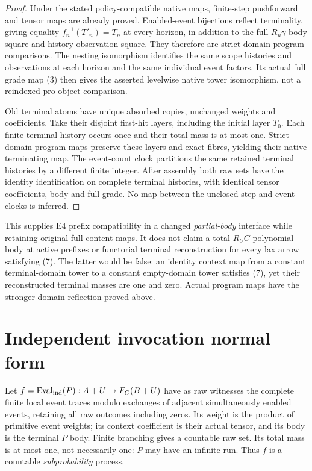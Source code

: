 \documentclass[11pt]{article}
\begin{document}
\begin{proof}
Under the stated policy-compatible native maps, finite-step pushforward and tensor maps are already proved. Enabled-event bijections reflect terminality, giving equality $f_n^{-1}(T'_n)=T_n$ at every horizon, in addition to the full $R_u\gamma$ body square and history-observation square. They therefore are strict-domain program comparisons. The nesting isomorphism identifies the same scope histories and observations at each horizon and the same individual event factors. Its actual full grade map (3) then gives the asserted levelwise native tower isomorphism, not a reindexed pro-object comparison.

Old terminal atoms have unique absorbed copies, unchanged weights and coefficients. Take their disjoint first-hit layers, including the initial layer $T_0$. Each finite terminal history occurs once and their total mass is at most one. Strict-domain program maps preserve these layers and exact fibres, yielding their native terminating map. The event-count clock partitions the same retained terminal histories by a different finite integer. After assembly both raw sets have the identity identification on complete terminal histories, with identical tensor coefficients, body and full grade. No map between the unclosed step and event clocks is inferred.
\end{proof}

This supplies E4 prefix compatibility in a changed \emph{partial-body} interface while retaining original full content maps. It does not claim a total-$R_UC$ polynomial body at active prefixes or functorial terminal reconstruction for every lax arrow satisfying (7). The latter would be false: an identity context map from a constant terminal-domain tower to a constant empty-domain tower satisfies (7), yet their reconstructed terminal masses are one and zero. Actual program maps have the stronger domain reflection proved above.

\section{Independent invocation normal form}
Let $f=\operatorname{Eval}_{\rm ind}(P):A+U\to F_C(B+U)$ have as raw witnesses the complete finite local event traces modulo exchanges of adjacent simultaneously enabled events, retaining all raw outcomes including zeros. Its weight is the product of primitive event weights; its context coefficient is their actual tensor, and its body is the terminal $P$ body. Finite branching gives a countable raw set. Its total mass is at most one, not necessarily one: $P$ may have an infinite run. Thus $f$ is a countable \emph{subprobability} process.
\end{document}
